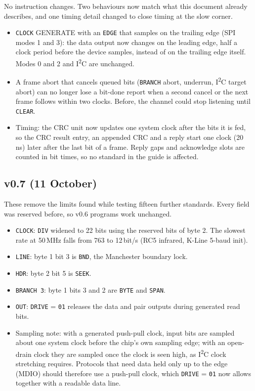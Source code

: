 \documentclass[11pt,a4paper]{article}
\newcommand{\sig}[1]{\texttt{#1}}
\begin{document}
No instruction changes. Two behaviours now match what this document already describes, and one timing detail changed to close timing at the slow corner.
\begin{itemize}
\item \sig{CLOCK} GENERATE with an \sig{EDGE} that samples on the trailing edge (SPI modes 1 and 3): the data output now changes on the leading edge, half a clock period before the device samples, instead of on the trailing edge itself. Modes 0 and 2 and I\textsuperscript{2}C are unchanged.
\item A frame abort that cancels queued bits (\sig{BRANCH} abort, underrun, I\textsuperscript{2}C target abort) can no longer lose a bit-done report when a second cancel or the next frame follows within two clocks. Before, the channel could stop listening until \sig{CLEAR}.
\item Timing: the CRC unit now updates one system clock after the bits it is fed, so the CRC result entry, an appended CRC and a reply start one clock (20\,ns) later after the last bit of a frame. Reply gaps and acknowledge slots are counted in bit times, so no standard in the guide is affected.
\end{itemize}

\subsection{v0.7 (11 October)}

These remove the limits found while testing fifteen further standards. Every field was reserved before, so v0.6 programs work unchanged.

\begin{itemize}
\item \sig{CLOCK}: \sig{DIV} widened to 22 bits using the reserved bits of byte 2. The slowest rate at 50\,MHz falls from 763 to 12\,bit/s (RC5 infrared, K-Line 5-baud init).
\item \sig{LINE}: byte 1 bit 3 is \sig{BND}, the Manchester boundary lock.
\item \sig{HDR}: byte 2 bit 5 is \sig{SEEK}.
\item \sig{BRANCH 3}: byte 1 bits 3 and 2 are \sig{BYTE} and \sig{SPAN}.
\item \sig{OUT}: \sig{DRIVE} = \texttt{01} releases the data and pair outputs during generated read bits.
\item Sampling note: with a generated push-pull clock, input bits are sampled about one system clock before the chip's own sampling edge; with an open-drain clock they are sampled once the clock is seen high, as I\textsuperscript{2}C clock stretching requires. Protocols that need data held only up to the edge (MDIO) should therefore use a push-pull clock, which \sig{DRIVE} = \texttt{01} now allows together with a readable data line.
\end{itemize}
\end{document}
